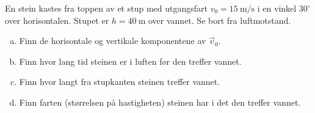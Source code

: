 %
En stein kastes fra toppen av et stup med utgangsfart $v_0 = \SI{15}{\metre\per\second}$ i en vinkel $30^\circ$ over horisontalen. Stupet er $h = \SI{40}{\metre}$ over vannet. Se bort fra luftmotstand.
\begin{enumerate}[a)]
    \item Finn de horisontale og vertikale komponentene av $\vec{v}_0$.
    \item Finn hvor lang tid steinen er i luften før den treffer vannet.
    \item Finn hvor langt fra stupkanten steinen treffer vannet.
    \item Finn farten (størrelsen på hastigheten) steinen har i det den treffer vannet.
\end{enumerate}
